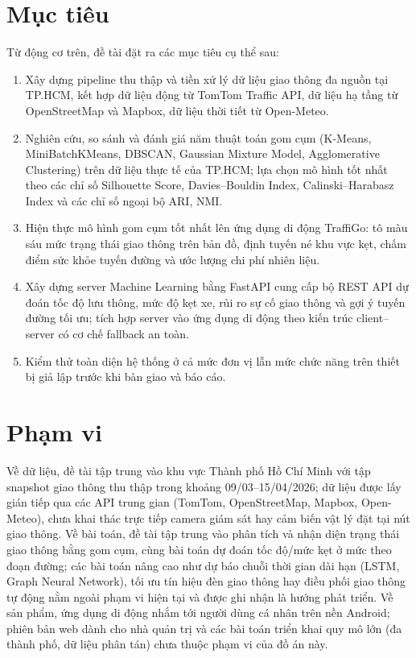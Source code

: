 \section{Mục tiêu}
Từ động cơ trên, đề tài đặt ra các mục tiêu cụ thể sau:
\begin{enumerate}[label=\textbf{(\arabic*)},leftmargin=2cm,itemsep=2pt]
 \item Xây dựng pipeline thu thập và tiền xử lý dữ liệu giao thông đa nguồn tại TP.HCM, kết hợp dữ liệu động từ TomTom Traffic API, dữ liệu hạ tầng từ OpenStreetMap và Mapbox, dữ liệu thời tiết từ Open-Meteo.
 \item Nghiên cứu, so sánh và đánh giá năm thuật toán gom cụm (K-Means, MiniBatchKMeans, DBSCAN, Gaussian Mixture Model, Agglomerative Clustering) trên dữ liệu thực tế của TP.HCM; lựa chọn mô hình tốt nhất theo các chỉ số Silhouette Score, Davies--Bouldin Index, Calinski--Harabasz Index và các chỉ số ngoại bộ ARI, NMI.
 \item Hiện thực mô hình gom cụm tốt nhất lên ứng dụng di động TraffiGo: tô màu sáu mức trạng thái giao thông trên bản đồ, định tuyến né khu vực kẹt, chấm điểm sức khỏe tuyến đường và ước lượng chi phí nhiên liệu.
 \item Xây dựng server Machine Learning bằng FastAPI cung cấp bộ REST API dự đoán tốc độ lưu thông, mức độ kẹt xe, rủi ro sự cố giao thông và gợi ý tuyến đường tối ưu; tích hợp server vào ứng dụng di động theo kiến trúc client--server có cơ chế fallback an toàn.
 \item Kiểm thử toàn diện hệ thống ở cả mức đơn vị lẫn mức chức năng trên thiết bị giả lập trước khi bàn giao và báo cáo.
\end{enumerate}

\section{Phạm vi}
Về dữ liệu, đề tài tập trung vào khu vực Thành phố Hồ Chí Minh với tập snapshot giao thông thu thập trong khoảng 09/03--15/04/2026; dữ liệu được lấy gián tiếp qua các API trung gian (TomTom, OpenStreetMap, Mapbox, Open-Meteo), chưa khai thác trực tiếp camera giám sát hay cảm biến vật lý đặt tại nút giao thông. Về bài toán, đề tài tập trung vào phân tích và nhận diện trạng thái giao thông bằng gom cụm, cùng bài toán dự đoán tốc độ/mức kẹt ở mức theo đoạn đường; các bài toán nâng cao như dự báo chuỗi thời gian dài hạn (LSTM, Graph Neural Network), tối ưu tín hiệu đèn giao thông hay điều phối giao thông tự động nằm ngoài phạm vi hiện tại và được ghi nhận là hướng phát triển. Về sản phẩm, ứng dụng di động nhắm tới người dùng cá nhân trên nền Android; phiên bản web dành cho nhà quản trị và các bài toán triển khai quy mô lớn (đa thành phố, dữ liệu phân tán) chưa thuộc phạm vi của đồ án này.

